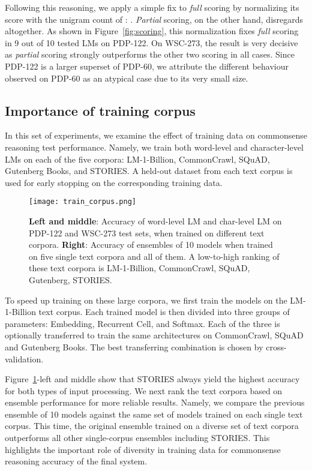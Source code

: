 \documentclass{article}
\begin{document}
Following this reasoning, we apply a simple fix to \emph{full} scoring by normalizing its score with the unigram count of : . \emph{Partial} scoring, on the other hand, disregards  altogether. As shown in Figure~\ref{fig:scoring}, this normalization fixes \emph{full} scoring in 9 out of 10 tested LMs on PDP-122. On WSC-273, the result is very decisive as \emph{partial} scoring strongly outperforms the other two scoring in all cases. Since PDP-122 is a larger superset of PDP-60, we attribute the different behaviour observed on PDP-60 as an atypical case due to its very small size.



\subsection{Importance of training corpus}

In this set of experiments, we examine the effect of training data on commonsense reasoning test performance. Namely, we train both word-level and character-level LMs on each of the five corpora: LM-1-Billion, CommonCrawl, SQuAD, Gutenberg Books, and STORIES. A held-out dataset from each text corpus is used for early stopping on the corresponding training data.

\begin{figure}[h!]
\centering
\texttt{[image: train\_corpus.png]}
\caption{\textbf{Left and middle}: Accuracy of word-level LM and char-level LM on PDP-122 and WSC-273 test sets, when trained on different text corpora. \textbf{Right}: Accuracy of ensembles of 10 models when trained on five single text corpora and all of them. A low-to-high ranking of these text corpora is LM-1-Billion, CommonCrawl, SQuAD, Gutenberg, STORIES.}
\label{fig:train_corpus}
\end{figure}

To speed up training on these large corpora, we first train the models on the LM-1-Billion text corpus. Each trained model is then divided into three groups of parameters: Embedding, Recurrent Cell, and Softmax. Each of the three is optionally transferred to train the same architectures on CommonCrawl, SQuAD and Gutenberg Books. The best transferring combination is chosen by cross-validation. 


Figure~\ref{fig:train_corpus}-left and middle show that STORIES always yield the highest accuracy for both types of input processing. We next rank the text corpora based on ensemble performance for more reliable results. Namely, we compare the previous ensemble of 10 models against the same set of models trained on each single text corpus. This time, the original ensemble trained on a diverse set of text corpora outperforms all other single-corpus ensembles including STORIES. This highlights the important role of diversity in training data for commonsense reasoning accuracy of the final system.
\end{document}
